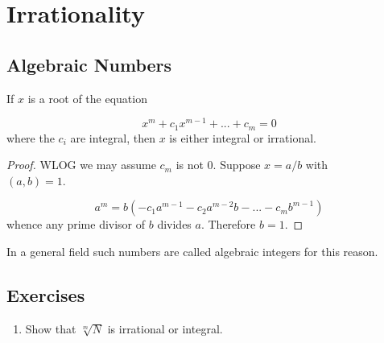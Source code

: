 \section{Irrationality}

\subsection{Algebraic Numbers}
\begin{theorem}\label{RRT}
    If $x$ is a root of the equation

    \begin{equation*}
        x^m + c_1x^{m-1} + ... + c_m = 0
    \end{equation*}
    \noi
    where the $c_i$ are integral, then $x$ is either integral or irrational.
\end{theorem}

\begin{proof}
    WLOG we may assume $c_m$ is not 0. Suppose $x = a/b$ with \\ $(a,b) = 1$.

    \begin{equation*}
        a^m = b(-c_1 a^{m-1} - c_2 a^{m-2}b - ... - c_m b^{m-1})
    \end{equation*}
    whence any prime divisor of $b$ divides $a$. Therefore $b=1$.
\end{proof}

\begin{remark}
    In a general field such numbers are called algebraic integers for this reason.
\end{remark}

\subsection{Exercises}
\begin{enumerate}
    \item Show that $\sqrt[m]{N}$ is irrational or integral. 
\end{enumerate}

